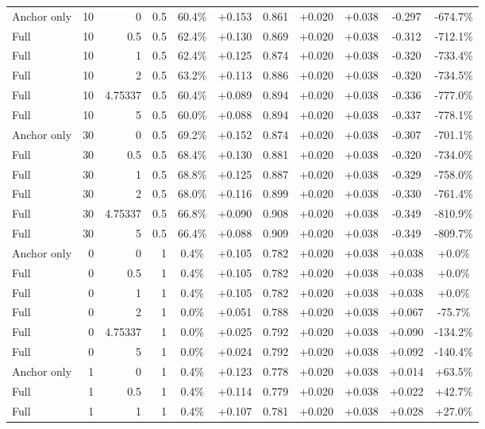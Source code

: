 \begin{table}[htbp]
\begin{tabular}{lrrrccccccc}
Anchor only & 10 & 0 & 0.5 & 60.4\% & +0.153 & 0.861 & +0.020 & +0.038 & -0.297 & -674.7\% \\
Full & 10 & 0.5 & 0.5 & 62.4\% & +0.130 & 0.869 & +0.020 & +0.038 & -0.312 & -712.1\% \\
Full & 10 & 1 & 0.5 & 62.4\% & +0.125 & 0.874 & +0.020 & +0.038 & -0.320 & -733.4\% \\
Full & 10 & 2 & 0.5 & 63.2\% & +0.113 & 0.886 & +0.020 & +0.038 & -0.320 & -734.5\% \\
Full & 10 & 4.75337 & 0.5 & 60.4\% & +0.089 & 0.894 & +0.020 & +0.038 & -0.336 & -777.0\% \\
Full & 10 & 5 & 0.5 & 60.0\% & +0.088 & 0.894 & +0.020 & +0.038 & -0.337 & -778.1\% \\
Anchor only & 30 & 0 & 0.5 & 69.2\% & +0.152 & 0.874 & +0.020 & +0.038 & -0.307 & -701.1\% \\
Full & 30 & 0.5 & 0.5 & 68.4\% & +0.130 & 0.881 & +0.020 & +0.038 & -0.320 & -734.0\% \\
Full & 30 & 1 & 0.5 & 68.8\% & +0.125 & 0.887 & +0.020 & +0.038 & -0.329 & -758.0\% \\
Full & 30 & 2 & 0.5 & 68.0\% & +0.116 & 0.899 & +0.020 & +0.038 & -0.330 & -761.4\% \\
Full & 30 & 4.75337 & 0.5 & 66.8\% & +0.090 & 0.908 & +0.020 & +0.038 & -0.349 & -810.9\% \\
Full & 30 & 5 & 0.5 & 66.4\% & +0.088 & 0.909 & +0.020 & +0.038 & -0.349 & -809.7\% \\
Anchor only & 0 & 0 & 1 & 0.4\% & +0.105 & 0.782 & +0.020 & +0.038 & +0.038 & +0.0\% \\
Full & 0 & 0.5 & 1 & 0.4\% & +0.105 & 0.782 & +0.020 & +0.038 & +0.038 & +0.0\% \\
Full & 0 & 1 & 1 & 0.4\% & +0.105 & 0.782 & +0.020 & +0.038 & +0.038 & +0.0\% \\
Full & 0 & 2 & 1 & 0.0\% & +0.051 & 0.788 & +0.020 & +0.038 & +0.067 & -75.7\% \\
Full & 0 & 4.75337 & 1 & 0.0\% & +0.025 & 0.792 & +0.020 & +0.038 & +0.090 & -134.2\% \\
Full & 0 & 5 & 1 & 0.0\% & +0.024 & 0.792 & +0.020 & +0.038 & +0.092 & -140.4\% \\
Anchor only & 1 & 0 & 1 & 0.4\% & +0.123 & 0.778 & +0.020 & +0.038 & +0.014 & +63.5\% \\
Full & 1 & 0.5 & 1 & 0.4\% & +0.114 & 0.779 & +0.020 & +0.038 & +0.022 & +42.7\% \\
Full & 1 & 1 & 1 & 0.4\% & +0.107 & 0.781 & +0.020 & +0.038 & +0.028 & +27.0\% \\

\end{tabular}
\end{table}
